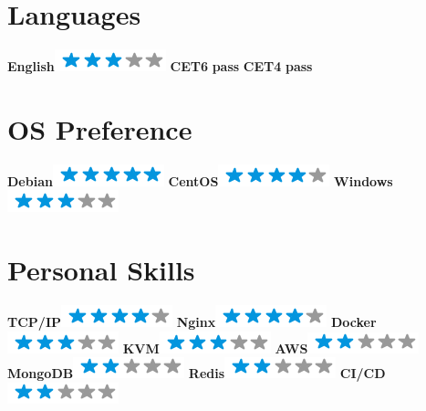 \documentclass[]{friggeri-cv}
\begin{document}
\begin{aside}
  \section{Languages}
    \textbf{English}\includegraphics[scale=0.40]{img/3stars.png}
    \textbf{CET6} \hspace{7mm}  \textbf{pass}
    \textbf{CET4} \hspace{7mm}  \textbf{pass}
 \section{OS Preference}
    \textbf{Debian}\includegraphics[scale=0.40]{img/5stars.png}
    \textbf{CentOS}\includegraphics[scale=0.40]{img/4stars.png}
    \textbf{Windows}\includegraphics[scale=0.40]{img/3stars.png}
  \section{Personal Skills}
  \textbf{TCP/IP}\includegraphics[scale=0.40]{img/4stars.png}
  \textbf{Nginx}\includegraphics[scale=0.40]{img/4stars.png}
  \textbf{Docker}\includegraphics[scale=0.40]{img/3stars.png}
  \textbf{KVM}\includegraphics[scale=0.40]{img/3stars.png}
  \textbf{AWS}\includegraphics[scale=0.40]{img/2stars.png}
  \textbf{MongoDB}\includegraphics[scale=0.40]{img/2stars.png}
  \textbf{Redis}\includegraphics[scale=0.40]{img/2stars.png}
  \textbf{CI/CD}\includegraphics[scale=0.40]{img/2stars.png}
  ~
  ~
\end{aside}
\end{document}
